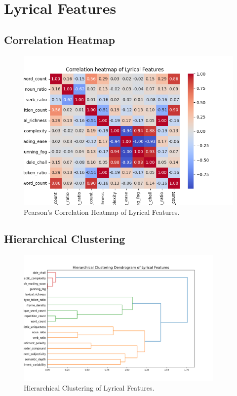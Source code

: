 \section{Lyrical Features}

\subsection*{Correlation Heatmap}
\label{sec:correlationheatmapsspotifyfeatures}

\begin{center}
\begin{figure}[H]
  \centering
  \includegraphics[width=5in]{img/corr_heatmap_lyrical.png}
  \caption{Pearson's Correlation Heatmap of Lyrical Features.}
  \label{Figure:fig_beh}
\end{figure}
\end{center}

\subsection*{Hierarchical Clustering}
\label{sec:hierarchicalclustering}

\begin{center}
\begin{figure}[H]
  \centering
  \includegraphics[width=4in]{img/dendrogram_lyrical.png}
  \caption{Hierarchical Clustering of Lyrical Features.}
  \label{Figure:dendrogram_spotify_features}
\end{figure}
\end{center}


